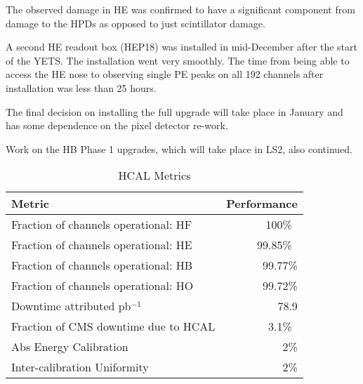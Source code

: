 \documentclass[12pt]{article}
\begin{document}
The observed damage in HE was confirmed to have a significant component from damage
to the HPDs as opposed to just scintillator damage.

A second HE readout box (HEP18) was installed in mid-December after the start of the YETS.
The installation went very smoothly. The time from being able to access the HE nose
to observing single PE peaks on all 192 channels after installation was less than 25 hours.

The final decision on installing the full upgrade will take place in January and has some
dependence on the pixel detector re-work.



Work on the HB Phase 1 upgrades, which will take place in LS2, also continued.
 
\vspace*{3mm}





\begin{table}[htp]
\caption{HCAL Metrics}
\begin{center}
\begin{tabular}{|l|r|}
\hline
Metric&Performance\\
\hline
Fraction of channels operational: HF& 100\%\ \\
\hline
Fraction of channels operational: HE& 99.85\%\ \\
\hline
Fraction of channels operational: HB& 99.77\% \\
\hline
Fraction of channels operational: HO& 99.72\%  \\
\hline
Downtime attributed pb$^{-1}$ & 78.9 \\
Fraction of CMS downtime due to HCAL& 3.1\%\ \\
\hline
Abs Energy Calibration & 2\% \\
\hline
Inter-calibration Uniformity & 2\% \\
\hline
\end{tabular}
\end{center}
\label{HCALMetrics}
\end{table}%
\end{document}
